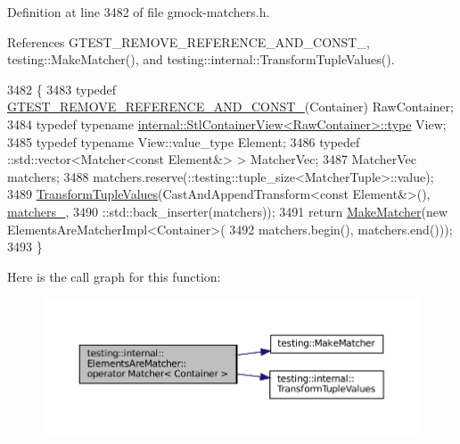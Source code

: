 Definition at line 3482 of file gmock-\/matchers.\+h.



References G\+T\+E\+S\+T\+\_\+\+R\+E\+M\+O\+V\+E\+\_\+\+R\+E\+F\+E\+R\+E\+N\+C\+E\+\_\+\+A\+N\+D\+\_\+\+C\+O\+N\+S\+T\+\_\+, testing\+::\+Make\+Matcher(), and testing\+::internal\+::\+Transform\+Tuple\+Values().


\begin{DoxyCode}
3482                                       \{
3483     \textcolor{keyword}{typedef} \hyperlink{gtest-internal_8h_a874567b176266188fabfffb8393267ce}{GTEST\_REMOVE\_REFERENCE\_AND\_CONST\_}(Container) RawContainer;
3484     \textcolor{keyword}{typedef} \textcolor{keyword}{typename} \hyperlink{classtesting_1_1internal_1_1StlContainerView_a2b2c63a6dcdbfe63fb0ee121ebf463ba}{internal::StlContainerView<RawContainer>::type}
       View;
3485     \textcolor{keyword}{typedef} \textcolor{keyword}{typename} View::value\_type Element;
3486     typedef ::std::vector<Matcher<const Element&> > MatcherVec;
3487     MatcherVec matchers;
3488     matchers.reserve(::testing::tuple\_size<MatcherTuple>::value);
3489     \hyperlink{namespacetesting_1_1internal_a07ba091a64aa2ba95e41accc55dc8855}{TransformTupleValues}(CastAndAppendTransform<const Element&>(), 
      \hyperlink{classtesting_1_1internal_1_1ElementsAreMatcher_a3e7acc958d30ad5303e8e126d2d1c11e}{matchers\_},
3490                          ::std::back\_inserter(matchers));
3491     \textcolor{keywordflow}{return} \hyperlink{namespacetesting_a37fd8029ac00e60952440a3d9cca8166}{MakeMatcher}(\textcolor{keyword}{new} ElementsAreMatcherImpl<Container>(
3492                            matchers.begin(), matchers.end()));
3493   \}
\end{DoxyCode}
Here is the call graph for this function\+:
\nopagebreak
\begin{figure}[H]
\begin{center}
\leavevmode
\includegraphics[width=350pt]{classtesting_1_1internal_1_1ElementsAreMatcher_a6e6eaf8918c5d581b4b62ece23559be9_cgraph}
\end{center}
\end{figure}


